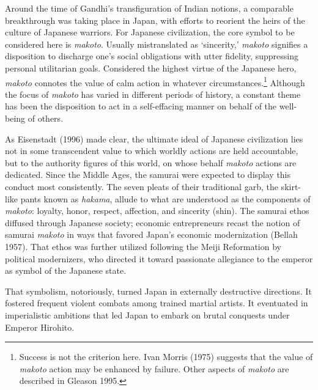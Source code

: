Around the time of Gandhi's transfiguration of Indian notions, a comparable breakthrough was taking place in Japan, with efforts to reorient the heirs of the culture of Japanese warriors. For Japanese civilization, the core symbol to be considered here is \emph{makoto}. Usually mistranslated as `sincerity,' \emph{makoto} signifies a disposition to discharge one's social obligations with utter fidelity, suppressing personal utilitarian goals. Considered the highest virtue of the Japanese hero, \emph{makoto} connotes the value of calm action in whatever circumstances.\footnote{Success is not the criterion here. Ivan Morris (1975) suggests that the value of \emph{makoto} action may be enhanced by failure. Other aspects of \emph{makoto} are described in Gleason 1995.} Although the focus of \emph{makoto} has varied in different periods of history, a constant theme has been the disposition to act in a self-effacing manner on behalf of the well-being of others.

As Eisenstadt (1996) made clear, the ultimate ideal of Japanese civilization lies not in some transcendent value to which worldly actions are held accountable, but to the authority figures of this world, on whose behalf \emph{makoto} actions are dedicated. Since the Middle Ages, the samurai were expected to display this conduct most consistently. The seven pleats of their traditional garb, the skirt-like pants known as \emph{hakama}, allude to what are understood as the components of \emph{makoto}: loyalty, honor, respect, affection, and sincerity (shin). The samurai ethos diffused through Japanese society; economic entrepreneurs recast the notion of samurai \emph{makoto} in ways that favored Japan's economic modernization (Bellah 1957). That ethos was further utilized following the Meiji Reformation by political modernizers, who directed it toward passionate allegiance to the emperor as symbol of the Japanese state.

That symbolism, notoriously, turned Japan in externally destructive directions. It fostered frequent violent combats among trained martial artists. It eventuated in imperialistic ambitions that led Japan to embark on brutal conquests under Emperor Hirohito.

